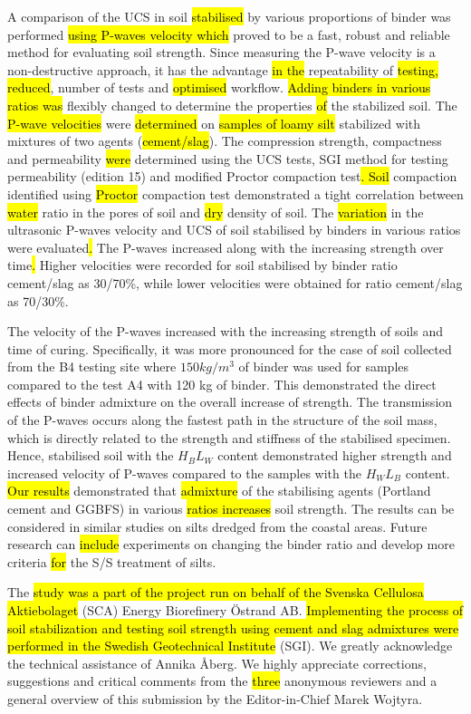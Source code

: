 \documentclass{amestyle}
\begin{document}
A comparison of the UCS in soil \hl{stabilised} by various proportions of binder was performed \hl{using P-waves velocity which} proved to be a fast, robust and reliable method for evaluating \hl{ }soil strength. Since measuring the P-wave velocity is a non-destructive approach, it has the advantage \hl{in the} repeatability of \hl{testing, reduced}, number of tests and \hl{optimised} workflow. \hl{Adding binders in various ratios was} flexibly changed to determine the properties \hl{of} the stabilized soil. The \hl{P-wave velocities} were \hl{determined} on \hl{samples of loamy silt} stabilized with mixtures of two agents (\hl{cement/slag}). The compression strength, compactness and permeability \hl{were} determined using the UCS tests, SGI method for testing permeability (edition 15) and modified Proctor compaction test\hl{. Soil} compaction identified using \hl{Proctor} compaction test demonstrated a tight correlation between \hl{water} ratio in the pores of soil and \hl{dry} density of soil. The \hl{variation} in the ultrasonic P-waves velocity and UCS of soil stabilised by binders in various ratios were evaluated\hl{. }The P-waves\hl{ }increased along with the increasing strength\hl{ }over time\hl{. }Higher velocities were recorded for\hl{ }soil stabilised by binder ratio\hl{ }cement/slag as 30/70\%, while lower velocities were obtained for ratio\hl{ }cement/slag as 70/30\%. 

The velocity of the P-waves increased with the increasing strength of soils and time of curing. Specifically, it was more pronounced for the case of soil collected from the B4 testing site where $150 kg/m^3$ of binder was used for samples compared to the test A4 with 120 kg of binder. This demonstrated the direct effects of binder admixture on the overall increase of strength. The transmission of the P-waves occurs along the fastest path in the structure of the soil mass, which is directly related to the strength and stiffness of the stabilised specimen. Hence, stabilised soil with the $H_BL_W$ content demonstrated higher strength and increased velocity of P-waves compared to the samples with the $H_WL_B$  content. \hl{Our results} demonstrated that \hl{admixture} of the stabilising agents (Portland cement and GGBFS) in various \hl{ratios increases} soil strength. The results can be considered in similar studies on silts dredged from the coastal areas. Future research can \hl{include }experiments on changing the binder ratio\hl{ }and develop more criteria \hl{for }the S/S treatment of silts.

\begin{acknowledgements}
The \hl{study was a part of the project run on behalf of the Svenska Cellulosa Aktiebolaget} (SCA) Energy Biorefinery \"Ostrand AB. \hl{Implementing the process of soil stabilization and testing soil strength using cement and slag admixtures were performed in the Swedish Geotechnical Institute} (SGI).
We greatly acknowledge the technical assistance of Annika Åberg. We highly appreciate corrections, suggestions and critical comments from the \hl{three} anonymous reviewers and a general overview of this submission by the Editor-in-Chief Marek Wojtyra.
\end{acknowledgements}
\end{document}
